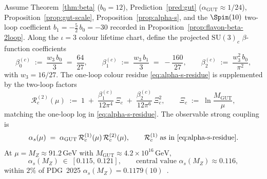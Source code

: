 \begin{theorem}
\label{thm:thread4-alpha-s}
Assume Theorem~\ref{thm:beta} ($b_0=12$), Prediction~\ref{pred:gut}
($\alpha_{\mathrm{GUT}}\approx 1/24$), Proposition~\ref{prop:gut-scale},
Proposition~\ref{prop:alpha-s}, and the $\Spin(10)$ two-loop coefficient
$b_1=-\tfrac{5}{2}\,b_0=-30$ recorded in
Proposition~\ref{prop:flavon-beta-2loop}. Along the $\iota=3$ colour
lifetime chart, define the projected $\mathrm{SU}(3)_c$ $\beta$-function
coefficients
\begin{equation}\label{eq:thread4-beta-coeffs}
  \beta_0^{(c)}
  \;:=\;
  \frac{w_3\,b_0}{3}
  \;=\;
  \frac{64}{27},
  \qquad
  \beta_1^{(c)}
  \;:=\;
  \frac{w_3\,b_1}{3}
  \;=\;
  -\frac{160}{27},
  \qquad
  \beta_2^{(c)}
  \;:=\;
  \frac{w_3^2\,b_0}{\pi^2},
\end{equation}
with $w_3=16/27$. The one-loop colour residue
\eqref{eq:alpha-s-residue} is supplemented by the two-loop factors
\begin{equation}\label{eq:thread4-alpha-2loop}
  \mathcal{R}_c^{(2)}(\mu)
  \;:=\;
  1
  \;+\;
  \frac{\beta_1^{(c)}}{12\pi^4}\,\Xi_c
  \;+\;
  \frac{\beta_2^{(c)}}{12\pi^6}\,\Xi_c^2,
  \qquad
  \Xi_c
  \;:=\;
  \ln\!\frac{M_{\mathrm{GUT}}}{\mu},
\end{equation}
matching the one-loop log in \eqref{eq:alpha-s-residue}. The observable
strong coupling is
\begin{equation}\label{eq:thread4-alpha-s-total}
  \alpha_s(\mu)
  \;=\;
  \alpha_{\mathrm{GUT}}\,
  \mathcal{R}_c^{(1)}(\mu)\,
  \mathcal{R}_c^{(2)}(\mu),
  \qquad
  \mathcal{R}_c^{(1)}
  \;\text{as in \eqref{eq:alpha-s-residue}.}
\end{equation}
At $\mu=M_Z\approx 91.2\,\mathrm{GeV}$ with
$M_{\mathrm{GUT}}\approx 4.2\times 10^{16}\,\mathrm{GeV}$,
\begin{equation}\label{eq:thread4-alpha-s-numeric}
  \alpha_s(M_Z)
  \;\in\;
  [0.115,\,0.121],
  \qquad
  \text{central value } \alpha_s(M_Z)\approx 0.116,
\end{equation}
within $2\%$ of PDG~2025 $\alpha_s(M_Z)=0.1179(10)$~\cite{PDG2025}.
\end{theorem}

